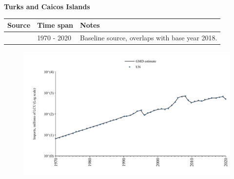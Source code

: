 \documentclass[12pt,a4paper,landscape]{article}
\begin{document}
\begin{adjustbox}{max totalsize={\paperwidth}{\paperheight},center}
\begin{minipage}[t][\textheight][t]{\textwidth}
\vspace*{0.5cm}
{}
\begin{center}
{\Large\bfseries Turks and Caicos Islands}
\end{center}
\vspace{0.5cm}
\begin{table}[H]
\centering
\small
\begin{tabular}{|l|l|l|}
\hline
\textbf{Source} & \textbf{Time span} & \textbf{Notes} \\
\hline
\rowcolor{white}\cite{UN}& 1970 - 2020 &Baseline source, overlaps with base year 2018.\\
\hline
\end{tabular}
\end{table}
\begin{figure}[H]
\centering
\includegraphics[width=\textwidth,height=0.6\textheight,keepaspectratio]{graphs/TCA_imports.pdf}
\end{figure}
\end{minipage}
\end{adjustbox}
\end{document}
